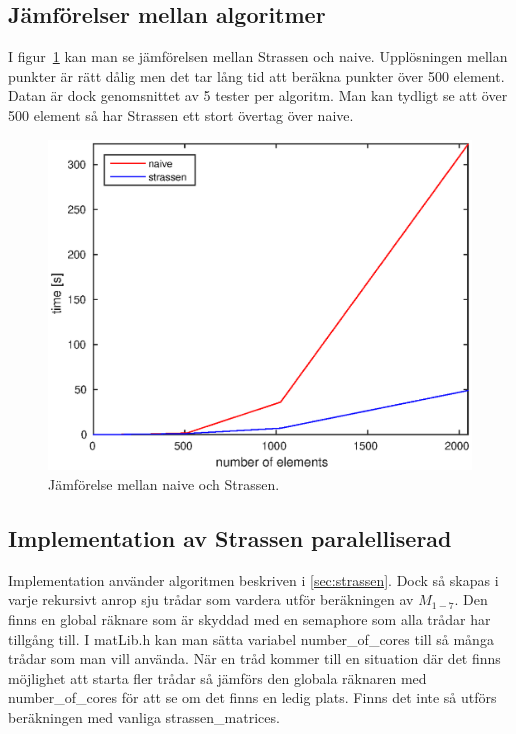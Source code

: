 \subsection{Jämförelser mellan algoritmer}
I figur~\ref{fig:comparison} kan man se jämförelsen mellan Strassen och naive. Upplösningen mellan punkter är rätt dålig men det tar lång tid att beräkna punkter över 500 element. Datan är dock genomsnittet av 5 tester per algoritm. Man kan tydligt se att över 500 element så har Strassen ett stort övertag över naive. 

\begin{figure}[H]
	\begin{center}
		\includegraphics[scale=0.6]{martin-tex/comparison.eps}
	\end{center}
	\caption{Jämförelse mellan naive och Strassen.}
	\label{fig:comparison}
\end{figure}

\subsection{Implementation av Strassen paralelliserad}
Implementation använder algoritmen beskriven i \ref{sec:strassen}. Dock så skapas i varje rekursivt anrop sju trådar som vardera utför beräkningen av $M_{1-7}$. Den finns en global räknare som är skyddad med en semaphore som alla trådar har tillgång till. I matLib.h kan man sätta variabel number\_of\_cores till så många trådar som man vill använda. När en tråd kommer till en situation där det finns möjlighet att starta fler trådar så jämförs den globala räknaren med number\_of\_cores för att se om det finns en ledig plats. Finns det inte så utförs beräkningen med vanliga strassen\_matrices. 


